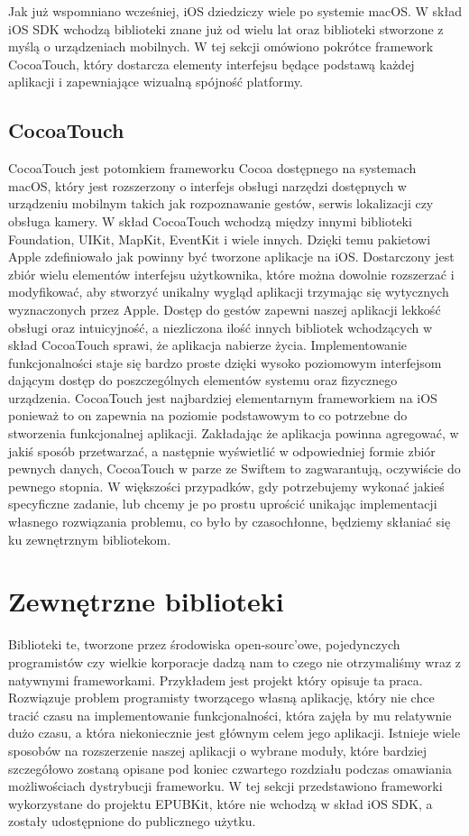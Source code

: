 Jak już wspomniano wcześniej, iOS dziedziczy wiele po systemie macOS. W skład iOS SDK wchodzą biblioteki znane już od wielu lat oraz biblioteki stworzone z myślą o urządzeniach mobilnych. W tej sekcji omówiono pokrótce framework CocoaTouch, który dostarcza elementy interfejsu będące podstawą każdej aplikacji i zapewniające wizualną spójność platformy.

\subsection{CocoaTouch}

CocoaTouch jest potomkiem frameworku Cocoa dostępnego na systemach macOS, który jest rozszerzony o interfejs obsługi narzędzi dostępnych w urządzeniu mobilnym takich jak rozpoznawanie gestów, serwis lokalizacji czy obsługa kamery. W skład CocoaTouch wchodzą między innymi biblioteki Foundation, UIKit, MapKit, EventKit i wiele innych. Dzięki temu pakietowi Apple zdefiniowało jak powinny być tworzone aplikacje na iOS. Dostarczony jest zbiór wielu elementów interfejsu użytkownika, które można dowolnie rozszerzać i modyfikować, aby stworzyć unikalny wygląd aplikacji trzymając się wytycznych wyznaczonych przez Apple. Dostęp do gestów zapewni naszej aplikacji lekkość obsługi oraz intuicyjność, a niezliczona ilość innych bibliotek wchodzących w skład CocoaTouch sprawi, że aplikacja nabierze życia. Implementowanie funkcjonalności staje się bardzo proste dzięki wysoko poziomowym interfejsom dającym dostęp do poszczególnych elementów systemu oraz fizycznego urządzenia. CocoaTouch jest najbardziej elementarnym frameworkiem na iOS ponieważ to on zapewnia na poziomie podstawowym to co potrzebne do stworzenia funkcjonalnej aplikacji. Zakładając że aplikacja powinna agregować, w jakiś sposób przetwarzać, a następnie wyświetlić w odpowiedniej formie zbiór pewnych danych, CocoaTouch w parze ze Swiftem to zagwarantują, oczywiście do pewnego stopnia. W większości przypadków, gdy potrzebujemy wykonać jakieś specyficzne zadanie, lub chcemy je po prostu uprościć unikając implementacji własnego rozwiązania problemu, co było by czasochłonne, będziemy skłaniać się ku zewnętrznym bibliotekom.

\section{Zewnętrzne biblioteki}

Biblioteki te, tworzone przez środowiska open-sourc’owe, pojedynczych programistów czy wielkie korporacje dadzą nam to czego nie otrzymaliśmy wraz z natywnymi frameworkami. Przykładem jest projekt który opisuje ta praca. Rozwiązuje problem programisty tworzącego własną aplikację, który nie chce tracić czasu na implementowanie funkcjonalności, która zajęła by mu relatywnie dużo czasu, a która niekoniecznie jest głównym celem jego aplikacji. Istnieje wiele sposobów na rozszerzenie naszej aplikacji o wybrane moduły, które bardziej szczegółowo zostaną opisane pod koniec czwartego rozdziału podczas omawiania możliwościach dystrybucji frameworku. W tej sekcji przedstawiono frameworki wykorzystane do projektu EPUBKit, które nie wchodzą w skład iOS SDK, a zostały udostępnione do publicznego użytku.

